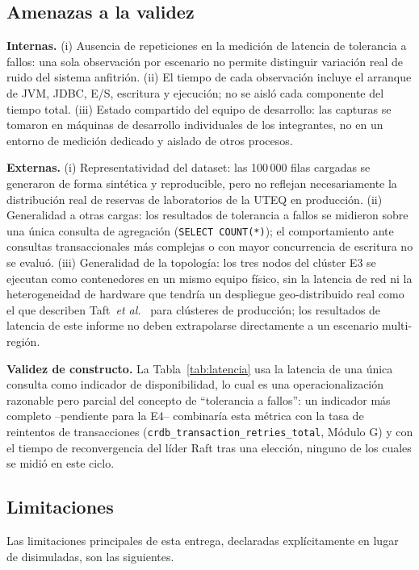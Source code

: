 \documentclass[10pt,twocolumn]{article}
\begin{document}
\subsection{Amenazas a la validez}

\textbf{Internas.} (i) Ausencia de repeticiones en la medición de latencia
de tolerancia a fallos: una sola observación por escenario no permite
distinguir variación real de ruido del sistema anfitrión. (ii) El tiempo de
cada observación incluye el arranque de JVM, JDBC, E/S, escritura y ejecución;
no se aisló cada componente del tiempo total. (iii)
Estado compartido del equipo de desarrollo: las capturas se tomaron en
máquinas de desarrollo individuales de los integrantes, no en un entorno de
medición dedicado y aislado de otros procesos.

\textbf{Externas.} (i) Representatividad del dataset: las 100\,000 filas
cargadas se generaron de forma sintética y reproducible, pero no reflejan
necesariamente la distribución real de reservas de laboratorios de la UTEQ
en producción. (ii) Generalidad a otras cargas: los resultados de
tolerancia a fallos se midieron sobre una única consulta de agregación
(\texttt{SELECT COUNT(*)}); el comportamiento ante consultas transaccionales
más complejas o con mayor concurrencia de escritura no se evaluó. (iii)
Generalidad de la topología: los tres nodos del clúster E3 se ejecutan como
contenedores en un mismo equipo físico, sin la latencia de red ni la
heterogeneidad de hardware que tendría un despliegue geo-distribuido real
como el que describen Taft~\emph{et al.}~\cite{taft2020} para clústeres de
producción; los resultados de latencia de este informe no deben
extrapolarse directamente a un escenario multi-región.

\textbf{Validez de constructo.} La Tabla~\ref{tab:latencia} usa la
latencia de una única consulta como indicador de disponibilidad, lo cual es
una operacionalización razonable pero parcial del concepto de
``tolerancia a fallos'': un indicador más completo --pendiente para la E4--
combinaría esta métrica con la tasa de reintentos de transacciones
(\texttt{crdb\_transaction\_retries\_total}, Módulo G) y con el tiempo de
reconvergencia del líder Raft tras una elección, ninguno de los cuales se
midió en este ciclo.

\subsection{Limitaciones}

Las limitaciones principales de esta entrega, declaradas explícitamente en
lugar de disimuladas, son las siguientes.
\end{document}
